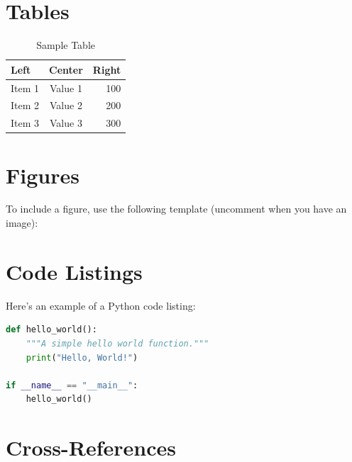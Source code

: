 \documentclass[12pt,a4paper]{article}
\begin{document}
\section{Tables}

\begin{table}[h]
    \centering
    \caption{Sample Table}
    \label{tab:sample}
    \begin{tabular}{|l|c|r|}
        \hline
        \textbf{Left} & \textbf{Center} & \textbf{Right} \\
        \hline
        Item 1 & Value 1 & 100 \\
        Item 2 & Value 2 & 200 \\
        Item 3 & Value 3 & 300 \\
        \hline
    \end{tabular}
\end{table}

\section{Figures}

To include a figure, use the following template (uncomment when you have an image):


\section{Code Listings}

Here's an example of a Python code listing:

\begin{lstlisting}[language=Python, caption={Hello World in Python}]
def hello_world():
    """A simple hello world function."""
    print("Hello, World!")
    
if __name__ == "__main__":
    hello_world()
\end{lstlisting}

\section{Cross-References}
\end{document}
